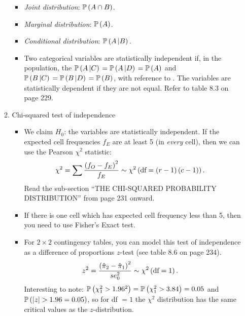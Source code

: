 \begin{enumerate}[label=\textbf{\S~\arabic*}, ref=\S~\arabic*]
\begin{enumerate}[label=\textbf{\S~8.\arabic*}, ref=\S~8.\arabic*]
\begin{itemize}
            \item \textit{Joint distribution}: $\operatorname{\mathbb{P}}{\left( A \cap B\right)}$.
            \item \textit{Marginal distribution}: $\operatorname{\mathbb{P}}{\left( A\right)}$.
            \item \textit{Conditional distribution}: $\operatorname{\mathbb{P}}{\left( A \left| B \right) \right. }$.
            \item Two categorical variables are statistically independent if, in the population, the $\operatorname{\mathbb{P}}{\left( A \left| C \right) \right. } = \operatorname{\mathbb{P}}{\left( A \left| D \right) \right. } = \operatorname{\mathbb{P}}{\left( A\right)}$ and $\operatorname{\mathbb{P}}{\left( B \left| C \right) \right. } = \operatorname{\mathbb{P}}{\left( B \left| D \right) \right. } = \operatorname{\mathbb{P}}{\left( B\right)}$, with reference to . The variables are statistically dependent if they are not equal. Refer to table 8.3 on page 229.
        \end{itemize}
        
        \item Chi-squared test of independence
        \begin{itemize}
            \item We claim $H_0$: the variables are statistically independent. If the expected cell frequencies $f_E$ are at least 5 (in \textit{every} cell), then we can use the Pearson $\chi^2$ statistic:
            \begin{align*}
                \chi^2 &= \sum \frac{\left( f_O - f_E\right)^2}{f_E} \sim \chi^2 \left( \text{df}=\left( r-1\right)(c-1)\right).
            \end{align*}
            Read the sub-section ``THE CHI-SQUARED PROBABILITY DISTRIBUTION'' from page 231 onward. 
            \item If there is one cell which has expected cell frequency less than 5, then you need to use Fisher's Exact test. 
            \item For $2 \times 2$ contingency tables, you can model this test of independence as a difference of proportions $z$-test (see table 8.6 on page 234).
            \begin{align*}
                z^2 &= \frac{\left( \Hat{\pi}_2 - \Hat{\pi}_1\right)^2}{se_0^2} \sim \chi^2 \left( \text{df}=1\right).
            \end{align*}
            Interesting to note: $\operatorname{\mathbb{P}}{\left( \chi^2_1> 1.96^2\right)} = \operatorname{\mathbb{P}}{\left( \chi^2_1>3.84\right)} = 0.05$ and $\operatorname{\mathbb{P}}{\left( \left\vert z\right\vert>1.96 = 0.05\right)}$, so for df $=1$ the $\chi^2$ distribution has the same critical values as the $z$-distribution.
        \end{itemize}
    \end{enumerate}
\end{enumerate}